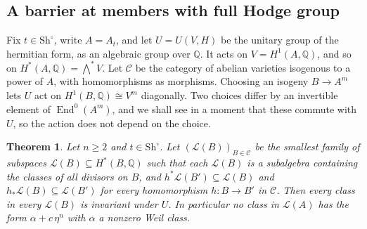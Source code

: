 \documentclass[11pt]{amsart}
\newtheorem{theorem}{Theorem}
\theoremstyle{definition}
\theoremstyle{remark}
\newcommand{\QQ}{\mathbb{Q}}
\newcommand{\End}{\operatorname{End}}
\newcommand{\Sh}{\mathrm{Sh}}
\begin{document}
\subsection{A barrier at members with full Hodge group}

Fix $t\in\Sh^{\circ}$, write $A=A_{t}$, and let $U=U(V,H)$ be the unitary
group of the hermitian form, as an algebraic group over $\QQ$. It acts on
$V=H^{1}(A,\QQ)$, and so on $H^{*}(A,\QQ)=\bigwedge^{*}V$. Let $\mathcal C$
be the category of abelian varieties isogenous to a power of $A$, with
homomorphisms as morphisms. Choosing an isogeny $B\to A^{m}$ lets $U$ act on
$H^{1}(B,\QQ)\cong V^{m}$ diagonally. Two choices differ by an invertible
element of $\End^{0}(A^{m})$, and we shall see in a moment that these
commute with $U$, so the action does not depend on the choice.

\begin{theorem}\label{thm:barrier}
Let $n\ge2$ and $t\in\Sh^{\circ}$. Let $(\mathcal L(B))_{B\in\mathcal C}$ be
the smallest family of subspaces $\mathcal L(B)\subseteq H^{*}(B,\QQ)$
such that each $\mathcal L(B)$ is a subalgebra containing the classes of all
divisors on $B$, and $h^{*}\mathcal L(B')\subseteq\mathcal L(B)$ and
$h_{*}\mathcal L(B)\subseteq\mathcal L(B')$ for every homomorphism
$h\colon B\to B'$ in $\mathcal C$. Then every class in every $\mathcal L(B)$
is invariant under $U$. In particular no class in $\mathcal L(A)$ has the
form $\alpha+c\,\eta^{n}$ with $\alpha$ a nonzero Weil class.
\end{theorem}
\end{document}
